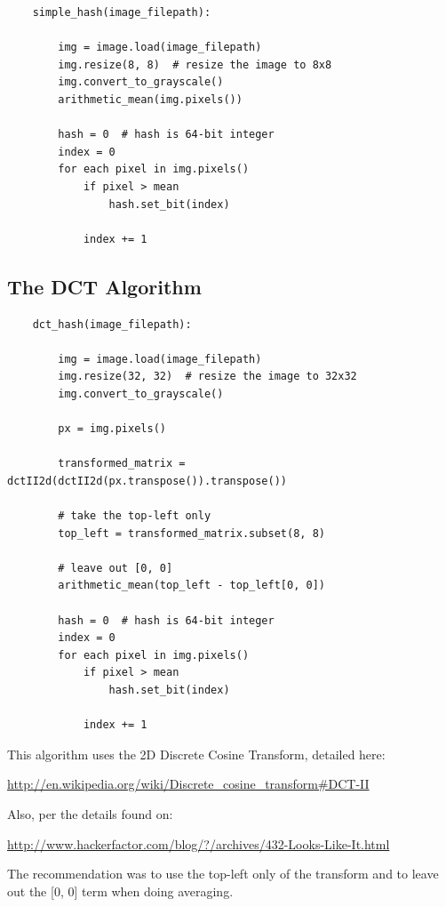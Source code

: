 \documentclass[11pt,a4paper,titlepage]{article}
\begin{document}
\begin{lstlisting}
    simple_hash(image_filepath):

        img = image.load(image_filepath)
        img.resize(8, 8)  # resize the image to 8x8
        img.convert_to_grayscale()
        arithmetic_mean(img.pixels())

        hash = 0  # hash is 64-bit integer
        index = 0
        for each pixel in img.pixels()
            if pixel > mean
                hash.set_bit(index)

            index += 1

\end{lstlisting}

\subsection{The DCT Algorithm}

\begin{lstlisting}
    dct_hash(image_filepath):

        img = image.load(image_filepath)
        img.resize(32, 32)  # resize the image to 32x32
        img.convert_to_grayscale()

        px = img.pixels()

        transformed_matrix = dctII2d(dctII2d(px.transpose()).transpose())
        
        # take the top-left only
        top_left = transformed_matrix.subset(8, 8)

        # leave out [0, 0]
        arithmetic_mean(top_left - top_left[0, 0])

        hash = 0  # hash is 64-bit integer
        index = 0
        for each pixel in img.pixels()
            if pixel > mean
                hash.set_bit(index)

            index += 1

\end{lstlisting}

This algorithm uses the 2D Discrete Cosine Transform, detailed here:

\url{http://en.wikipedia.org/wiki/Discrete_cosine_transform#DCT-II}

Also, per the details found on:

\url{http://www.hackerfactor.com/blog/?/archives/432-Looks-Like-It.html}

The recommendation was to use the top-left only of the transform and to leave
out the [0, 0] term when doing averaging.
\end{document}
